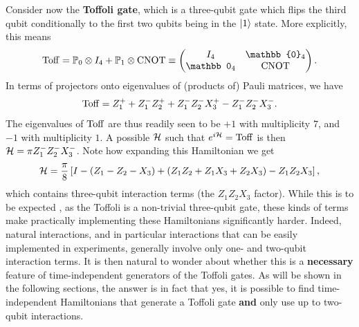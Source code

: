 \begin{example}[label={ex:eigendecomposition_Toffoli}]
Consider now the \textbf{Toffoli gate}, which is a three-qubit gate which flips the third qubit conditionally to the first two qubits being in the $\ket1$ state.
More explicitly, this means
\begin{equation}
    \Toff =
    \PP_0\otimes I_4 + \PP_1\otimes\CNOT
    \equiv
    \begin{pmatrix}
        I_4 & \mathbb{0}_4 \\
        \mathbb 0_4 & \CNOT
    \end{pmatrix}.
\end{equation}
In terms of projectors onto eigenvalues of (products of) Pauli matrices, we have
\begin{equation}
    \operatorname{Toff} = Z_1^+ + Z_1^- Z_2^+ + Z_1^- Z_2^- X_3^+ - Z_1^- Z_2^- X_3^-.
\end{equation}
The eigenvalues of $\operatorname{Toff}$ are thus readily seen to be $+1$ with multiplicity $7$, and $-1$ with multiplicity $1$.
A possible $\mathcal{H}$ such that $e^{i\cal H}=\operatorname{Toff}$ is then $\mathcal{H}=\pi Z_1^- Z_2^- X_3^-$.
Note how expanding this Hamiltonian we get
\begin{equation}
    \mathcal{H} = \frac{\pi}{8}\left[
        I - (Z_1 - Z_2 - X_3)
        + (Z_1 Z_2 + Z_1 X_3 + Z_2 X_3)
        - Z_1 Z_2 X_3
    \right],
\end{equation}
which contains three-qubit interaction terms (the $Z_1 Z_2 X_3$ factor). While this is to be expected , as the Toffoli is a non-trivial three-qubit gate, these kinds of terms make practically implementing these Hamiltonians significantly harder.
Indeed, natural interactions, and in particular interactions that can be easily implemented in experiments, generally  involve only one- and two-qubit interaction terms.
It is then natural to wonder about whether this is a \textbf{necessary} feature of time-independent generators of the Toffoli gates.
As will be shown in the following sections, the answer is in fact that yes, it is possible to find time-independent Hamiltonians that generate a Toffoli gate \textbf{and} only use up to two-qubit interactions.
\end{example}

